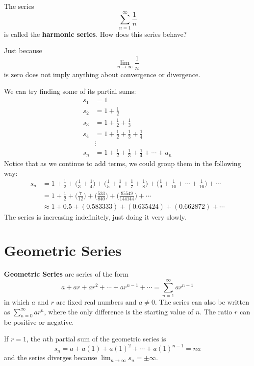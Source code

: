 \begin{ex}
  The series
  \[ \sum_{n=1}^{\infty} \frac{1}{n} \]
  is called the \textbf{harmonic series}. How does this series behave?
  \begin{remark}
    Just because
    \[ \lim_{n \to \infty} \frac{1}{n}\]
    is zero does not imply anything about convergence or divergence.
  \end{remark}

  We can try finding some of its partial sums:
  \begin{align*}
    s_1 & = 1 \\
    s_2 & = 1 + \frac{1}{2} \\
    s_3 & = 1 + \frac{1}{2} + \frac{1}{3} \\
    s_4 & = 1 + \frac{1}{2} + \frac{1}{3} + \frac{1}{4} \\
    &\vdots \\
    s_n & = 1 + \frac{1}{2} + \frac{1}{3} + \frac{1}{4} + \cdots + a_n
  \end{align*}
  Notice that as we continue to add terms, we could group them in the following
  way:
  \begin{align*}
    s_n &= 1 + \frac{1}{2} + \bigg( \frac{1}{3} + \frac{1}{4} \bigg)
    + \bigg( \frac{1}{5} + \frac{1}{6} + \frac{1}{7} + \frac{1}{8} \bigg)
    + \bigg( \frac{1}{9} + \frac{1}{10} + \cdots + \frac{1}{16} \bigg)
    + \cdots\\
    &= 1 + \frac{1}{2} + \bigg( \frac{7}{12} \bigg)
    + \bigg( \frac{533}{840} \bigg)
    + \bigg( \frac{95549}{144144} \bigg)
    + \cdots \\
    &\approx 1+ 0.5 + (0.583333) + (0.635424) + (0.662872) + \cdots
  \end{align*}
  The series is increasing indefinitely, just doing it very slowly.
  \end{ex}


\section{Geometric Series}

\textbf{Geometric Series} are series of the form
\[a + ar + ar^2 +\cdots +ar^{n-1}+\cdots=\sum_{n=1}^\infty ar^{n-1} \]
in which $a$ and $r$ are fixed real numbers and $a \neq 0$. The series can also
be written as $\sum_{n=0}^\infty ar^n$, where the only difference is the
starting value of $n$. The ratio $r$ can be positive or negative.

If $r=1$, the $n$th partial sum of the geometric series is
\[ s_n=a+a(1)+a(1)^2+\cdots+a(1)^{n-1}=na \]
and the series diverges because $\lim_{n \to\infty} s_n = \pm \infty$.

